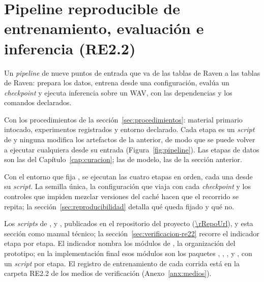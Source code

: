 \section{Pipeline reproducible de entrenamiento, evaluación e inferencia (RE2.2)}
\label{sec:re22}

 Un \textit{pipeline} de nueve puntos de entrada que va de las
tablas de Raven a las tablas de Raven: prepara los datos, entrena desde una
configuración, evalúa un \textit{checkpoint} y ejecuta inferencia sobre un WAV,
con las dependencias y los comandos declarados.

 Con los procedimientos de la
sección~\ref{sec:procedimientos}: material primario intocado, experimentos
registrados y entorno declarado. Cada etapa es un \textit{script} de 
y ninguna modifica los artefactos de la anterior, de modo que
se puede volver a ejecutar cualquiera desde su entrada
(Figura~\ref{fig:pipeline}). Las etapas de datos son las del
Capítulo~\ref{cap:curacion}; las de modelo, las de la sección anterior.

 Con el entorno que fija , se ejecutan las
cuatro etapas en orden, cada una desde su \textit{script}. La semilla única, la
configuración que viaja con cada \textit{checkpoint} y los controles que
impiden mezclar versiones del caché hacen que el recorrido se repita; la
sección~\ref{sec:reproducibilidad} detalla qué queda fijado y qué no.

 Los \textit{scripts} de ,
 y , publicados en el repositorio del proyecto
(\url{\rRepoUrl}), y esta sección como manual técnico; la
sección~\ref{sec:verificacion-re22} recorre el indicador etapa por etapa. El
indicador nombra los módulos de , la organización del
prototipo; en la implementación final esos módulos son los paquetes
, , ,
 y , con un \textit{script} por
etapa. El registro de entrenamiento de cada corrida está en la carpeta RE2.2 de los
medios de verificación (Anexo~\ref{anx:medios}).

